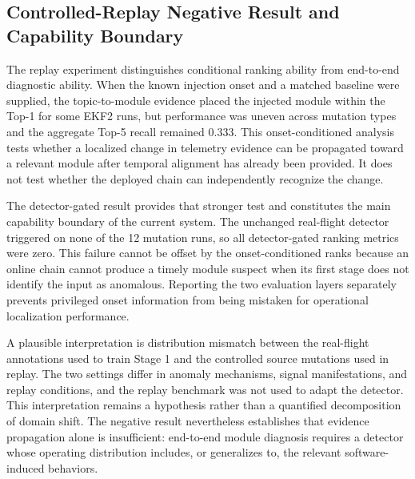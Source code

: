 \subsection{Controlled-Replay Negative Result and Capability Boundary}

The replay experiment distinguishes conditional ranking ability from end-to-end diagnostic ability. When the known injection onset and a matched baseline were supplied, the topic-to-module evidence placed the injected module within the Top-1 for some EKF2 runs, but performance was uneven across mutation types and the aggregate Top-5 recall remained 0.333. This onset-conditioned analysis tests whether a localized change in telemetry evidence can be propagated toward a relevant module after temporal alignment has already been provided. It does not test whether the deployed chain can independently recognize the change.

The detector-gated result provides that stronger test and constitutes the main capability boundary of the current system. The unchanged real-flight detector triggered on none of the 12 mutation runs, so all detector-gated ranking metrics were zero. This failure cannot be offset by the onset-conditioned ranks because an online chain cannot produce a timely module suspect when its first stage does not identify the input as anomalous. Reporting the two evaluation layers separately prevents privileged onset information from being mistaken for operational localization performance.

A plausible interpretation is distribution mismatch between the real-flight annotations used to train Stage 1 and the controlled source mutations used in replay. The two settings differ in anomaly mechanisms, signal manifestations, and replay conditions, and the replay benchmark was not used to adapt the detector. This interpretation remains a hypothesis rather than a quantified decomposition of domain shift. The negative result nevertheless establishes that evidence propagation alone is insufficient: end-to-end module diagnosis requires a detector whose operating distribution includes, or generalizes to, the relevant software-induced behaviors.
